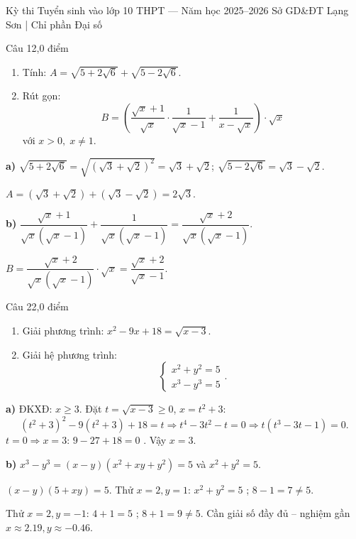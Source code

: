 ﻿%
%
  {Kỳ thi Tuyển sinh vào lớp 10 THPT — Năm học 2025--2026}%
  {Sở GD\&ĐT Lạng Sơn | Chỉ phần Đại số}

\begin{de_cau}{Câu 1}{2,0 điểm}
\begin{enumerate}[label=\alph*)]
  \item Tính: $A = \sqrt{5+2\sqrt{6}} + \sqrt{5-2\sqrt{6}}$.
  \item Rút gọn:
  \[B = \left(\dfrac{\sqrt{x}+1}{\sqrt{x}}\cdot\dfrac{1}{\sqrt{x}-1}+\dfrac{1}{x-\sqrt{x}}\right)\cdot\sqrt{x}\]
  với $x > 0,\; x \neq 1$.
\end{enumerate}
\end{de_cau}

\begin{loi_giai_cau}
\textbf{a)} $\sqrt{5+2\sqrt{6}}=\sqrt{(\sqrt{3}+\sqrt{2})^2}=\sqrt{3}+\sqrt{2}$; $\sqrt{5-2\sqrt{6}}=\sqrt{3}-\sqrt{2}$.

$A=(\sqrt{3}+\sqrt{2})+(\sqrt{3}-\sqrt{2})=\boxed{2\sqrt{3}}$.

\textbf{b)} $\dfrac{\sqrt{x}+1}{\sqrt{x}(\sqrt{x}-1)}+\dfrac{1}{\sqrt{x}(\sqrt{x}-1)}=\dfrac{\sqrt{x}+2}{\sqrt{x}(\sqrt{x}-1)}$.

$B=\dfrac{\sqrt{x}+2}{\sqrt{x}(\sqrt{x}-1)}\cdot\sqrt{x}=\boxed{\dfrac{\sqrt{x}+2}{\sqrt{x}-1}}$.
\end{loi_giai_cau}

\begin{de_cau}{Câu 2}{2,0 điểm}
\begin{enumerate}[label=\alph*)]
  \item Giải phương trình: $x^2 - 9x + 18 = \sqrt{x-3}$.
  \item Giải hệ phương trình:
  \[\begin{cases} x^2+y^2=5 \\ x^3-y^3=5 \end{cases}.\]
\end{enumerate}
\end{de_cau}

\begin{loi_giai_cau}
\textbf{a)} ĐKXĐ: $x\ge3$. Đặt $t=\sqrt{x-3}\ge0$, $x=t^2+3$:
\[(t^2+3)^2-9(t^2+3)+18=t \Rightarrow t^4-3t^2-t=0 \Rightarrow t(t^3-3t-1)=0.\]
$t=0\Rightarrow x=3$: $9-27+18=0$ \checkmark . Vậy $\boxed{x=3}$.

\textbf{b)} $x^3-y^3=(x-y)(x^2+xy+y^2)=5$ và $x^2+y^2=5$.

$(x-y)(5+xy)=5$. Thử $x=2,y=1$: $x^2+y^2=5$ \checkmark ; $8-1=7\neq5$.

Thử $x=2,y=-1$: $4+1=5$ \checkmark ; $8+1=9\neq5$. Cần giải số đầy đủ -- nghiệm gần $x\approx2.19,y\approx-0.46$.
\end{loi_giai_cau}

